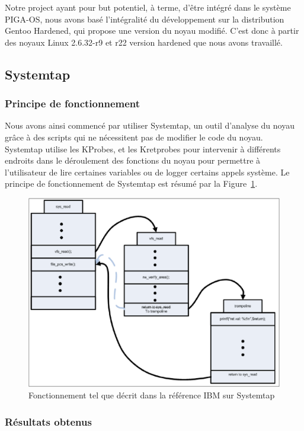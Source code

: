 \documentclass[pdftex,a4paper,titlepage,11pt]{article}
\begin{document}
Notre project ayant pour but potentiel, à terme, d'être intégré dans le système PIGA-OS, nous avons basé l'intégralité du développement sur la distribution Gentoo Hardened, qui propose une version du noyau modifié. C'est donc à partir des noyaux Linux 2.6.32-r9 et r22 version hardened que nous avons travaillé.

\subsection{Systemtap}

\subsubsection{Principe de fonctionnement}

Nous avons ainsi commencé par utiliser Systemtap, un outil d'analyse du noyau grâce à des scripts qui ne nécessitent pas de modifier le code du noyau. Systemtap utilise les KProbes, et les Kretprobes\cite{IBMRBST} pour intervenir à différents endroits dans le déroulement des fonctions du noyau pour permettre à l'utilisateur de lire certaines variables ou de logger certains appels système. Le principe de fonctionnement de Systemtap est résumé par la Figure~\ref{IBMST}.

\begin{figure}[h!]
	\centering
	\includegraphics[scale=0.4]{attachements/kretprob.png}
	\caption{Fonctionnement tel que décrit dans la référence IBM sur Systemtap \cite{IBMRBST}}
	\label{IBMST}
\end{figure}

\subsubsection{Résultats obtenus}
\end{document}
